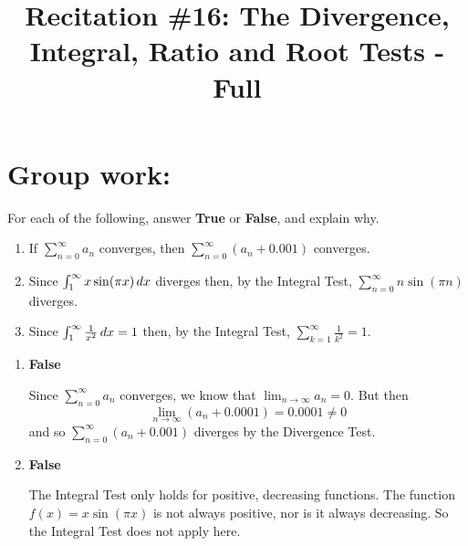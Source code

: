\documentclass[]{ximera}
\title{Recitation \#16: The Divergence, Integral, Ratio and Root Tests - Full}
\begin{document}
\begin{abstract}		\end{abstract}
\maketitle












\section{Group work:}



\begin{problem}
For each of the following, answer {\bf True} or {\bf False}, and explain why.
	\begin{enumerate}
	
	\item  If $\sum_{n=0}^\infty a_n$ converges, then $\sum_{n=0}^\infty (a_n + 0.001)$ converges.
	
	\item  Since $\int_1^\infty x \sin(\pi x) \,d x$ diverges then, by the Integral Test, $\sum_{n=0}^\infty n \sin(\pi n)$ diverges.
	
	\item  Since $\int_1^\infty \frac{1}{x^2} \,d x = 1$ then, by the Integral Test, $\sum_{k=1}^\infty \frac{1}{k^2} = 1$.  
	
	\end{enumerate}
	
	\begin{freeResponse}
		\begin{enumerate}
		
		\item  {\bf False}
		
		Since $\sum_{n=0}^\infty a_n$ converges, we know that $\lim_{n \to \infty} a_n = 0$.  
		But then 
			\[
			\lim_{n \to \infty} (a_n + 0.0001) = 0.0001 \neq 0
			\]
		and so $\sum_{n=0}^\infty (a_n + 0.001)$ diverges by the Divergence Test.
		
		
		
		\item  {\bf False}
		
		The Integral Test only holds for positive, decreasing functions.  
		The function $f(x)= x \sin(\pi x)$ is not always positive, nor is it always decreasing.  
		So the Integral Test does not apply here.
		

\end{enumerate}
\end{freeResponse}
\end{problem}
\end{document}
